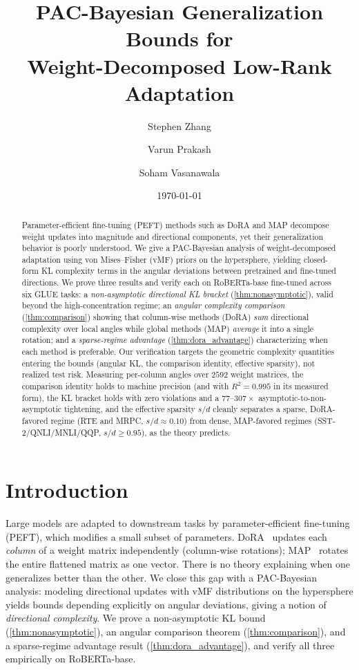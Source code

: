 \documentclass[10pt]{article}
\title{\textbf{PAC-Bayesian Generalization Bounds for\\
Weight-Decomposed Low-Rank Adaptation}}
\author{Stephen Zhang \and Varun Prakash \and Soham Vasanawala}
\date{\today}
\begin{document}
\maketitle
\vspace{-1.5em}

\begin{abstract}
\small
Parameter-efficient fine-tuning (PEFT) methods such as DoRA and MAP decompose weight
updates into magnitude and directional components, yet their generalization behavior
is poorly understood. We give a PAC-Bayesian analysis of weight-decomposed adaptation
using von Mises--Fisher (vMF) priors on the hypersphere, yielding closed-form KL
complexity terms in the angular deviations between pretrained and fine-tuned
directions. We prove three results and verify each on RoBERTa-base fine-tuned across
six GLUE tasks: a \emph{non-asymptotic directional KL bracket}
(\cref{thm:nonasymptotic}), valid beyond the high-concentration regime; an
\emph{angular complexity comparison} (\cref{thm:comparison}) showing that column-wise
methods (DoRA) \emph{sum} directional complexity over local angles while global
methods (MAP) \emph{average} it into a single rotation; and a \emph{sparse-regime
advantage} (\cref{thm:dora_advantage}) characterizing when each method is preferable.
Our verification targets the geometric complexity quantities entering the bounds
(angular KL, the comparison identity, effective sparsity), not realized test risk.
Measuring per-column angles over $2592$ weight matrices, the comparison identity holds
to machine precision (and with $R^2{=}0.995$ in its measured form), the KL bracket
holds with zero violations and a $77$--$307\times$ asymptotic-to-non-asymptotic
tightening, and the effective sparsity $s/d$ cleanly separates a sparse,
DoRA-favored regime (RTE and MRPC, $s/d{\approx}0.10$) from dense, MAP-favored regimes
(SST-2/QNLI/MNLI/QQP, $s/d{\ge}0.95$), as the theory predicts.
\end{abstract}

\section{Introduction}
Large models are adapted to downstream tasks by parameter-efficient fine-tuning
(PEFT), which modifies a small subset of parameters. DoRA~\cite{liu2024dora} updates
each \emph{column} of a weight matrix independently (column-wise rotations); MAP~\cite{si2025map}
rotates the entire flattened matrix as one vector. There is no theory explaining when
one generalizes better than the other. We close this gap with a PAC-Bayesian analysis:
modeling directional updates with vMF distributions on the hypersphere yields bounds
depending explicitly on angular deviations, giving a notion of \emph{directional
complexity}. We prove a non-asymptotic KL bound (\cref{thm:nonasymptotic}), an
angular comparison theorem (\cref{thm:comparison}), and a sparse-regime advantage
result (\cref{thm:dora_advantage}), and verify all three empirically on RoBERTa-base.
\end{document}
